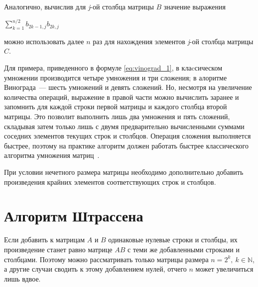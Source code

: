 Аналогично, вычислив для \textit{j}-ой столбца матрицы $B$ значение выражения

$\sum_{k = 1}^{n / 2}b_{2k - 1,j}b_{2k,j}$

можно использовать далее $n$ раз для нахождения элементов \textit{j}-ой столбца матрицы $C$.

Для примера, приведенного в формуле \ref{eq:vinograd_1}, в клаcсическом умножении производится четыре умножения и три сложения; в алоритме Винограда~--- шесть умножений и девять сложений. Но, несмотря на увеличение количества операций, выражение в правой части можно вычислить заранее и запомнить для каждой строки первой матрицы и каждого столбца второй матрицы.
Это позволит выполнить лишь два умножения и пять сложений, складывая затем только лишь с двумя предварительно вычисленными суммами соседних элементов текущих строк и столбцов. Операция сложения выполняется быстрее, поэтому на практике алгоритм должен работать быстрее классического алгоритма умножения матриц~\cite{vinograd-alg}.

При условии нечетного размера матрицы необходимо дополнительно добавить произведения крайних элементов соответствующих строк и столбцов.

\section{Алгоритм Штрассена}
Если добавить к матрицам $A$ и $B$ одинаковые нулевые строки и столбцы, их произведение станет равно матрице $AB$ с теми же добавленными строками и столбцами. Поэтому можно рассматривать только матрицы размера $n=2^k,\ k \in \mathbb{N}$, а другие случаи сводить к этому добавлением нулей, отчего $n$ может увеличиться лишь вдвое.


